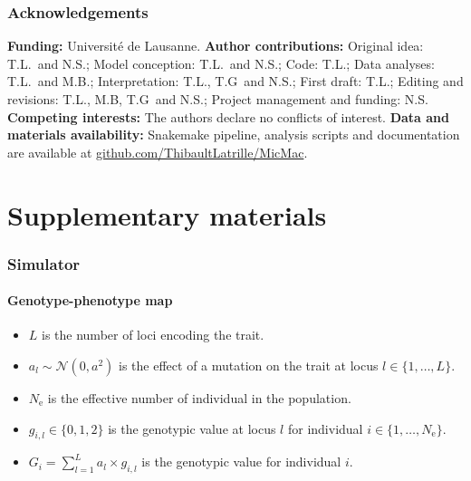 \documentclass{article}
\newcommand{\Ne}{N_{\text{e}}}
\newcommand{\NbrLoci}{L}
\begin{document}
\section*{Acknowledgements}
\label{sec:acknowledgment}
\textbf{Funding:}
Université de Lausanne.
\textbf{Author contributions:}
Original idea: T.L.\ and N.S.;
Model conception: T.L.\ and N.S.;
Code: T.L.;
Data analyses: T.L.\ and M.B.;
Interpretation: T.L., T.G\ and N.S.;
First draft: T.L.;
Editing and revisions: T.L., M.B, T.G\ and N.S.;
Project management and funding: N.S\@.
\textbf{Competing interests:}
The authors declare no conflicts of interest.
\textbf{Data and materials availability:}
Snakemake pipeline, analysis scripts and documentation are available at \href{https://github.com/ThibaultLatrille/MicMac}{github.com/ThibaultLatrille/MicMac}.

\printbibliography

\newpage

\part*{Supplementary materials}
\renewcommand{\thetable}{S\arabic{table}}
\renewcommand{\thefigure}{S\arabic{figure}}
\setcounter{figure}{0}
\setcounter{table}{0}

\section{Simulator}

\subsection{Genotype-phenotype map}

\begin{itemize}
    \setlength\itemsep{-0.2em}
    \item $\NbrLoci$ is the number of loci encoding the trait.
    \item $a_l \sim \mathcal{N}(0,a^2)$ is the effect of a mutation on the trait at locus $l \in \{1, \hdots, \NbrLoci\}$.
    \item $\Ne$ is the effective number of individual in the population.
    \item $g_{i,l} \in \{0, 1, 2\}$ is the genotypic value at locus $l$ for individual $i \in \{1, \hdots, \Ne\}$.
    \item $G_i = \sum_{l=1}^{\NbrLoci} a_l \times g_{i,l}$ is the genotypic value for individual $i$.
\end{itemize}
\end{document}
